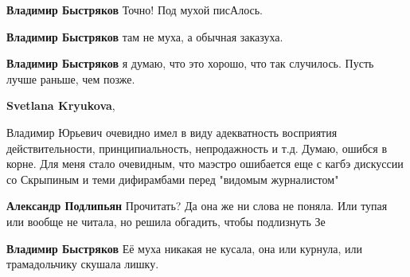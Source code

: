 \begin{itemize}
\begin{itemize}
\textbf{Владимир Быстряков} Точно! Под мухой писАлось.

 
\textbf{Владимир Быстряков} там не муха, а обычная заказуха.

 
\textbf{Владимир Быстряков} я думаю, что это хорошо, что так случилось. Пусть лучше раньше, чем позже.

 
\textbf{Svetlana Kryukova}, 

Владимир Юрьевич очевидно имел в виду адекватность восприятия действительности,
принципиальность, непродажность и т.д. Думаю, ошибся в корне. Для меня стало
очевидным, что маэстро ошибается еще с кагбэ дискуссии со Скрыпиным и теми
дифирамбами перед "видомым журналистом"


 
\textbf{Александр Подлипьян} Прочитать? Да она же ни слова не поняла. Или тупая или вообще не читала, но решила обгадить, чтобы подлизнуть Зе

 
\textbf{Владимир Быстряков} Её муха никакая не кусала, она или курнула, или трамадольчику скушала лишку.

 

\end{itemize}
\end{itemize}
